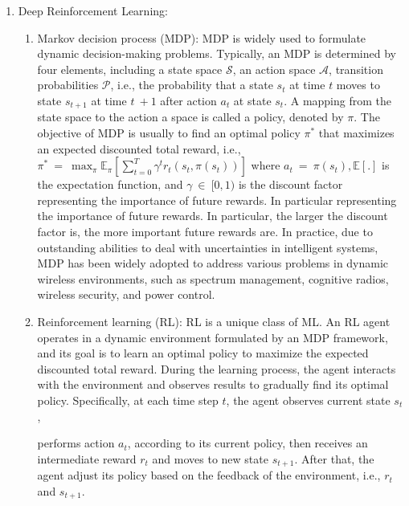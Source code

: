\documentclass[letterpaper%
, oneside%
, 12pt%
,thesepararticles%
, english%
,creativecommons,hyperref, withAlgo2e%
]{thETS}
\begin{document}
\begin{enumerate}
	\item Deep Reinforcement Learning:
	\begin{enumerate}
		\item {Markov decision process (MDP): MDP is widely used to formulate dynamic decision-making problems. Typically, an MDP is determined by four elements, including a state space $\displaystyle \mathcal{S}$, an action space $\displaystyle \mathcal{A}$, transition probabilities $\displaystyle \mathcal{P}$, i.e., the probability that a state $\displaystyle s_{t}$ at time $\displaystyle t$ moves to state $\displaystyle s_{t+1}$ at time $\displaystyle t\ +1$ after action $\displaystyle a_{t}$ at state $\displaystyle s_{t}$. A mapping from the state space to the action a space is called a policy, denoted by $\displaystyle \pi $. The objective of MDP is usually to find an optimal policy $\displaystyle \pi ^{*}$ that maximizes an expected discounted total reward, i.e., $ $$\displaystyle \pi ^{*} \ =\ \max_{\pi }\mathbb{E}_{\pi }\left[\sum\nolimits ^{T}_{t=0} \gamma ^{t} r_{t}( s_{t} ,\pi ( s_{t}))\right]$ where $\displaystyle a_{t} \ =\ \pi ( s_{t}) ,\mathbb{E}[ .]$ is the expectation function, and $\displaystyle \gamma \ \in \ [ 0,1)$ is the discount factor representing the importance of future rewards.
	 In particular representing the importance of future rewards. In particular, the larger the discount factor is, the more important future rewards are. In practice, due to outstanding abilities to deal with uncertainties in intelligent systems, MDP has been widely adopted to address various problems in dynamic wireless environments, such as spectrum management, cognitive radios, wireless security, and power control. \cite{7080987}}
	 \item {Reinforcement learning (RL): RL is a unique class of ML. An RL agent operates in a dynamic environment formulated by an MDP framework, and its goal is to learn an optimal policy to maximize the expected discounted total reward. During the learning process, the agent interacts with the environment and observes results to gradually find its optimal policy. Specifically, at each time step $\displaystyle t$, the agent observes current state $\displaystyle s_{t}$,

performs action $\displaystyle a_{t}$, according to its current policy, then receives an intermediate reward $\displaystyle r_{t}$ and moves to new  state $\displaystyle s_{t+1}$. After that, the agent adjust its policy based on the feedback of the environment, i.e., $\displaystyle r_{t}$ and $\displaystyle s_{t+1}$.

}
\end{enumerate}
\end{enumerate}
\end{document}
